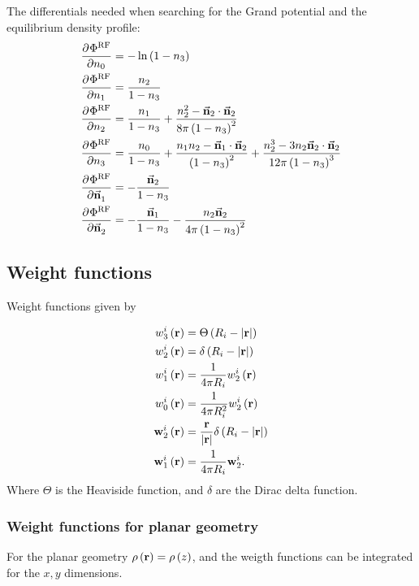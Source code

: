 \documentclass[12pt, letterpaper]{article}
\newcommand*{\pd}[3][]{\frac{\partial^{#1}#2}{\partial{#3}^{#1}}}%
\newcommand*{\vc}[1]{\vec{\mathbf{#1}}}%
\newcommand*{\abs}[1]{\lvert#1\rvert}
\newcommand*{\lb}{\ensuremath{\left(}}
\newcommand*{\rb}{\ensuremath{\right)}}
\newcommand{\RF}{\ensuremath{\text{RF}}\xspace}
\begin{document}
The differentials needed when searching for the Grand potential and the equilibrium density profile:
\begin{align}
  \pd{\Phi^\RF}{n_0} &= -\ln \lb 1 - n_3 \rb \\
  \pd{\Phi^\RF}{n_1} &= \frac{n_2}{1 - n_3} \\
  \pd{\Phi^\RF}{n_2} &= \frac{n_1}{1 - n_3} + \frac{n_2^2 - \vc{n}_2 \cdot \vc{n}_2}{8\pi \lb 1 - n_3 \rb^2} \\
  \pd{\Phi^\RF}{n_3} &= \frac{n_0}{1 - n_3} +
  \frac{n_1 n_2 - \vc{n}_1 \cdot \vc{n}_2}{\lb 1 - n_3 \rb^2} +
  \frac{n_2^3 - 3 n_2 \vc{n}_2 \cdot \vc{n}_2}{12\pi \lb 1 - n_3 \rb^3} \\
  \pd{\Phi^\RF}{\vc{n}_1} &=  - \frac{\vc{n}_2}{1 - n_3} \\
  \pd{\Phi^\RF}{\vc{n}_2} &=  -\frac{\vc{n}_1}{1 - n_3} - \frac{n_2 \vc{n}_2}{4\pi \lb 1 - n_3 \rb^2}
\end{align}

\subsection{Weight functions}
\label{sec:weight}
Weight functions given by

\begin{align}
  w_3^i \lb \mathbf{r} \rb &=  \Theta \lb R_i - \abs{\mathbf{r}} \rb \\
  w_2^i \lb \mathbf{r} \rb &=  \delta \lb R_i - \abs{\mathbf{r}} \rb \\
  w_1^i \lb \mathbf{r} \rb &= \frac{1}{4 \pi R_i} w_2^i \lb \mathbf{r} \rb \\
  w_0^i \lb \mathbf{r} \rb &= \frac{1}{4 \pi R_i^2} w_2^i \lb \mathbf{r} \rb \\
  \mathbf{w}_2^i \lb \mathbf{r} \rb &=  \frac{\mathbf{r}}{\abs{\mathbf{r}}}\delta \lb R_i - \abs{\mathbf{r}} \rb \\
  \mathbf{w}_1^i \lb \mathbf{r} \rb &= \frac{1}{4 \pi R_i} \mathbf{w}_2^i.
\end{align}
Where $\Theta$ is the Heaviside function, and $\delta$ are the Dirac delta function.

\subsubsection{Weight functions for planar geometry}
\label{sec:planar_weights}
For the planar geometry $\rho \lb \mathbf{r} \rb = \rho \lb z \rb $,
and the weigth functions can be integrated for the $x,y$ dimensions.
\end{document}
